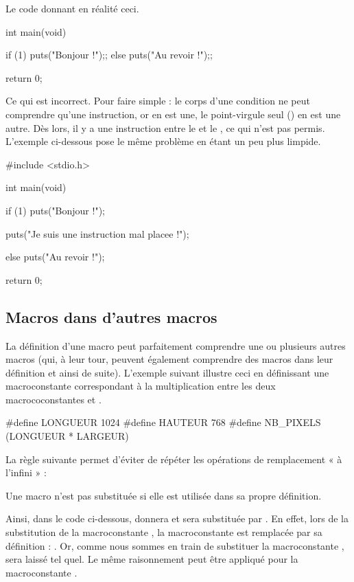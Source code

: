 Le code donnant en réalité ceci.

\begin{C}
int main(void)
{
    if (1)
        puts("Bonjour !");;
    else
        puts("Au revoir !");;

    return 0;
}
\end{C}

Ce qui est incorrect. Pour faire simple : le corps d'une condition ne
peut comprendre qu'une instruction, or  en
est une, le point-virgule seul (\mybox{;}) en est une autre. Dès lors,
il y a une instruction entre le  et le , ce qui
n'est pas permis. L'exemple ci-dessous pose le même problème en étant un
peu plus limpide.

\begin{C}
#include <stdio.h>


int main(void)
{
    if (1)
        puts("Bonjour !");

    puts("Je suis une instruction mal placee !");

    else
        puts("Au revoir !");

    return 0;
}
\end{C}

\subsection{Macros dans d'autres macros}
\label{macros-dans-dautres-macros}

La définition d'une macro peut parfaitement comprendre une ou plusieurs
autres macros (qui, à leur tour, peuvent également comprendre des macros
dans leur définition et ainsi de suite). L'exemple suivant illustre ceci
en définissant une macroconstante  correspondant à la
multiplication entre les deux macrococonstantes  et
.

\begin{C}
#define LONGUEUR 1024
#define HAUTEUR 768
#define NB_PIXELS (LONGUEUR * LARGEUR)
\end{C}

La règle suivante permet d'éviter de répéter les opérations de
remplacement « à l'infini » :

\begin{erreurbox}
  Une macro n'est pas substituée si elle est
utilisée dans sa propre définition.
\end{erreurbox}


Ainsi, dans le code ci-dessous,  donnera
 et  sera substituée par
. En effet, lors de la substitution de la
macroconstante , la macroconstante  est
remplacée par sa définition : . Or, comme nous
sommes en train de substituer la macroconstante ,
 sera laissé tel quel. Le même raisonnement peut être
appliqué pour la macroconstante .

